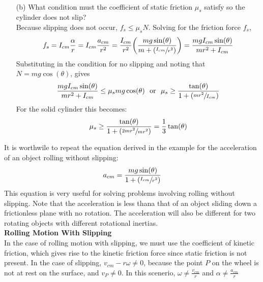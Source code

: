 \documentclass[a4paper]{article}
\let\bf\textbf
\begin{document}
\begin{shaded}
\begin{enumerate}
\begin{align*}
        \end{align*}
        \item[(b)] What condition must the coefficient of static friction $\mu_s$ satisfy so the cylinder does not slip?\vspace{2mm}\\
        Because slipping does not occur, $f_s \leq \mu_sN$. Solving for the friction force $f_s$,
        \begin{align*}
            f_s = I_{cm}\frac{\alpha}{r} = I_{cm}\frac{a_{cm}}{r^2} = \frac{I_{cm}}{r^2}\bigg(\frac{mg\sin(\theta)}{m + (\sfrac{I_{cm}}{r^2})}\bigg) = \frac{mgI_{cm}\sin(\theta)}{mr^2 + I_{cm}}
        \end{align*}
        Substituting in the condition for no slipping and noting that $N = mg\cos(\theta)$, gives
        \begin{align*}
            \frac{mgI_{cm}\sin(\theta)}{mr^2 + I_{cm}} \leq \mu_smg\cos(\theta)\ \text{ or }\ \mu_s \geq \frac{\tan(\theta)}{1 + (\sfrac{mr^2}{I_{cm}})}
        \end{align*}
        For the solid cylinder this becomes:
        \begin{align*}
            \mu_s \geq \frac{\tan(\theta)}{1 + (\sfrac{2mr^2}{mr^2})} = \frac{1}{3}\tan(\theta)
        \end{align*}
    \end{enumerate}
\end{shaded}
\newpage\noindent
It is worthwile to repeat the equation derived in the example for the acceleration of an object rolling without slipping:
\begin{equation}
    a_{cm} = \frac{mg\sin(\theta)}{1 + (\sfrac{I_{cm}}{r^2})}
\end{equation}
This equation is very useful for solving problems involving rolling without slipping. Note that the acceleration is less thana that of an object sliding down a frictionless plane with no rotation. The acceleration will also be different for two rotating objects with different rotational inertias.
\vspace{2mm}\\
\bf{Rolling Motion With Slipping}
\vspace{2mm}\\
In the case of rolling motion with slipping, we must use the coefficient of kinetic friction, which gives rise to the kinetic friction force since static friction is not present. In the case of slipping, $v_{cm} - r\omega \neq 0$, because the point $P$ on the wheel is not at rest on the surface, and $v_P \neq 0$. In this scenerio, $\omega \neq \frac{v_{cm}}{r}$ and $\alpha \neq \frac{a_{cm}}{r}$
\end{document}
